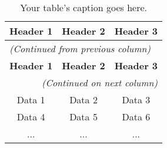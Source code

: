 \documentclass[twocolumn]{article} %
\begin{document}
\begin{table*}[ht] %
\renewcommand{\arraystretch}{1.2} %
\centering
\begin{longtable}{|c|c|c|} %
\hline
\textbf{Header 1} & \textbf{Header 2} & \textbf{Header 3} \\
\hline
\endfirsthead
\multicolumn{3}{l}{\textit{(Continued from previous column)}} \\ %
\hline
\textbf{Header 1} & \textbf{Header 2} & \textbf{Header 3} \\
\hline
\endhead
\hline
\multicolumn{3}{r}{\textit{(Continued on next column)}} \\ %
\hline
\endfoot
\hline
\endlastfoot

Data 1 & Data 2 & Data 3 \\ %
Data 4 & Data 5 & Data 6 \\
... & ... & ... \\ %

\end{longtable}
\caption{Your table's caption goes here.}
\end{table*}
\end{document}
